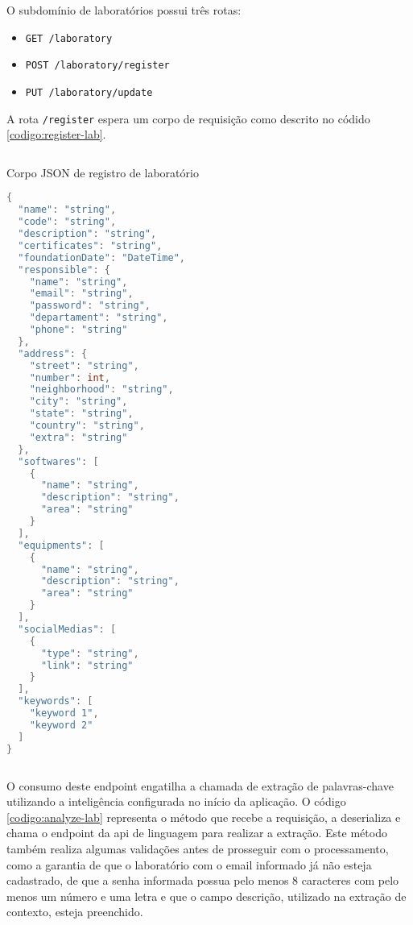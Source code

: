 O subdomínio de laboratórios possui três rotas:

\begin{itemize}
  \item \texttt{GET /laboratory}
  \item \texttt{POST /laboratory/register}
  \item \texttt{PUT /laboratory/update}
\end{itemize}

A rota \texttt{/register} espera um corpo de requisição como descrito no códido \ref{codigo:register-lab}.

\begin{sourcecode}[htb]
  \caption{\label{codigo:register-lab}Corpo JSON de registro de laboratório}
  \begin{lstlisting}[frame=single, language=Java]
{
  "name": "string",
  "code": "string",
  "description": "string",
  "certificates": "string",
  "foundationDate": "DateTime",
  "responsible": {
    "name": "string",
    "email": "string",
    "password": "string",
    "departament": "string",
    "phone": "string"
  },
  "address": {
    "street": "string",
    "number": int,
    "neighborhood": "string",
    "city": "string",
    "state": "string",
    "country": "string",
    "extra": "string"
  },
  "softwares": [
    {
      "name": "string",
      "description": "string",
      "area": "string"
    }
  ],
  "equipments": [
    {
      "name": "string",
      "description": "string",
      "area": "string"
    }
  ],
  "socialMedias": [
    {
      "type": "string",
      "link": "string"
    }
  ],
  "keywords": [
    "keyword 1",
    "keyword 2"
  ]
}
\end{lstlisting}
  \fonte{}
\end{sourcecode}

O consumo deste endpoint engatilha a chamada de extração de palavras-chave utilizando a inteligência configurada no início da aplicação. O código \ref{codigo:analyze-lab} representa o método que recebe a requisição, a deserializa e chama o endpoint da \gls{api} de linguagem para realizar a extração. Este método também realiza algumas validações antes de prosseguir com o processamento, como a garantia de que o laboratório com o email informado já não esteja cadastrado, de que a senha informada possua pelo menos 8 caracteres com pelo menos um número e uma letra e que o campo descrição, utilizado na extração de contexto, esteja preenchido.

